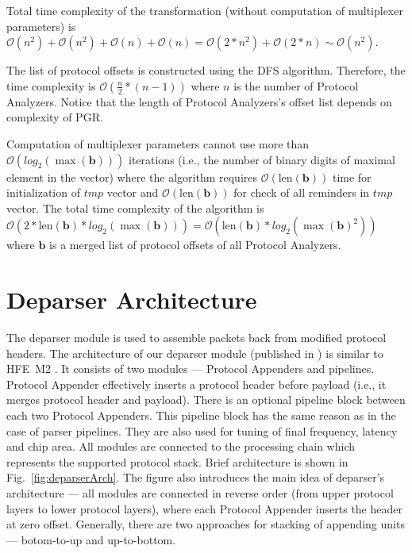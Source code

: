 Total time complexity of the transformation (without computation of multiplexer parameters) is 
$\mathcal{O}(n^2)+\mathcal{O}(n^2)+\mathcal{O}(n)+\mathcal{O}(n)=\mathcal{O}(2*n^2)+\mathcal{O}(2*n) \sim \mathcal{O}(n^2)$.

The list of protocol offsets is constructed using the DFS algorithm. Therefore, the time complexity is $\mathcal{O}(\frac{n}{2}*(n-1))$
where $n$ is the number of Protocol Analyzers. Notice that the length of Protocol Analyzers's offset list depends on complexity of PGR.

Computation of multiplexer parameters cannot use more than $\mathcal{O}(log_2(\max({\mathbf b})))$ iterations 
(i.e., the number of binary digits of maximal element in the vector) where the algorithm
requires $\mathcal{O}(\text{len}(\mathbf{b}))$ time for initialization of $tmp$ vector and $\mathcal{O}(\text{len}(\mathbf b))$ for check of
all reminders in $tmp$ vector. The total time complexity of the algorithm is 
$\mathcal{O}(2*\text{len}(\mathbf b)*log_2(\max({\mathbf b}))) = 
\mathcal{O}(\text{len}(\mathbf b)*log_2(\max({\mathbf b})^2))$ where
$\mathbf b$ is a merged list of protocol offsets of all Protocol Analyzers.

\section{Deparser Architecture}
\label{sec:deparserArch}
The deparser module is used to assemble packets back from modified protocol headers. 
The architecture of our deparser module (published in \cite{2016pesw,2016h2rc-p4,2016MicproP4}) is similar to HFE~M2 \cite{hfem2}. 
It consists of two modules --- Protocol Appenders and pipelines. 
Protocol Appender effectively inserts a protocol header before payload (i.e., it merges protocol header and payload). 
There is an optional pipeline block between each two Protocol Appenders. This pipeline block has the same 
reason as in the case of parser pipelines. They are also used for tuning of final frequency, latency and chip area. All modules
are connected to the processing chain which represents the supported protocol stack. 
Brief architecture is 
shown in Fig.~\ref{fig:deparserArch}. The figure also introduces the main idea of deparser's architecture --- all modules are connected
in reverse order (from upper protocol layers to lower protocol layers), where each Protocol Appender inserts the header at zero offset. 
Generally, there are two approaches for stacking of appending units --- botom-to-up and up-to-bottom. 

